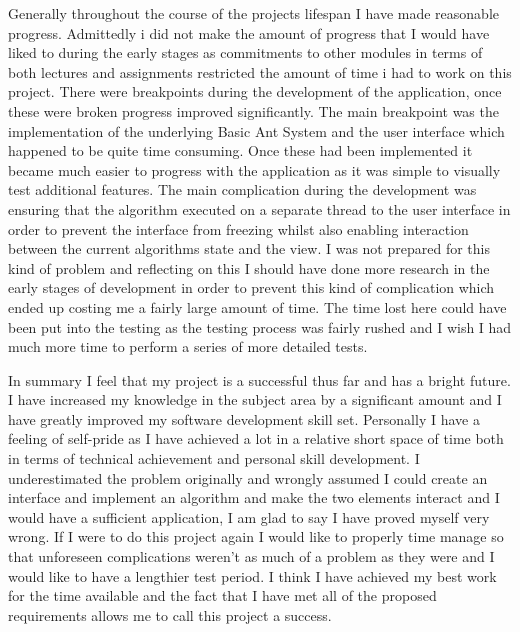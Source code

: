 Generally throughout the course of the projects lifespan I have made reasonable progress. Admittedly i did not make the amount of progress that I would have liked to during the early stages as commitments to other modules in terms of both lectures and assignments restricted the amount of time i had to work on this project. There were breakpoints during the development of the application, once these were broken progress improved significantly. The main breakpoint was the implementation of the underlying Basic Ant System and the user interface which happened to be quite time consuming. Once these had been implemented it became much easier to progress with the application as it was simple to visually test additional features. The main complication during the development was ensuring that the algorithm executed on a separate thread to the user interface in order to prevent the interface from freezing whilst also enabling interaction between the current algorithms state and the view. I was not prepared for this kind of problem and reflecting on this I should have done more research in the early stages of development in order to prevent this kind of complication which ended up costing me a fairly large amount of time. The time lost here could have been put into the testing as the testing process was fairly rushed and I wish I had much more time to perform a series of more detailed tests.

In summary I feel that my project is a successful thus far and has a bright future. I have increased my knowledge in the subject area by a significant amount and I have greatly improved my software development skill set. Personally I have a feeling of self-pride as I have achieved a lot in a relative short space of time both in terms of technical achievement and personal skill development. I underestimated the problem originally and wrongly assumed I could create an interface and implement an algorithm and make the two elements interact and I would have a sufficient application, I am glad to say I have proved myself very wrong. If I were to do this project again I would like to properly time manage so that unforeseen complications weren’t as much of a problem as they were and I would like to have a lengthier test period. I think I have achieved my best work for the time available and the fact that I have met all of the proposed requirements allows me to call this project a success.